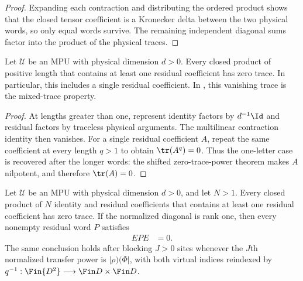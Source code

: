 \begin{proof}\leanok
    Expanding each contraction and distributing the ordered product shows that the closed
    tensor coefficient is a Kronecker delta between the two physical words,
    so only equal words survive.  The remaining independent diagonal sums
    factor into the product of the physical traces.
\end{proof}

\begin{lemma}
    \label{thm:mpu_positive_mixed_residual_trace}
    \leanok
    Let $\mathcal U$ be an MPU with physical dimension $d>0$.  Every closed
    product of positive length that contains at least one residual coefficient
    has zero trace.  In particular, this includes a single residual
    coefficient.  In \cite[Proposition~III.3(ii)]{Cirac2017MPU}, this vanishing trace is the mixed-trace
    property.
\end{lemma}

\begin{proof}\leanok
    At lengths greater than one, represent identity factors by
    $d^{-1}\Id$ and residual factors by traceless physical arguments.  The
    multilinear contraction identity then vanishes.  For a single residual
    coefficient $A$, repeat the same coefficient at every length $q>1$ to
    obtain $\tr(A^q)=0$.  Thus the one-letter case is recovered after the
    longer words: the shifted zero-trace-power theorem makes $A$ nilpotent,
    and therefore $\tr(A)=0$.
\end{proof}

\begin{lemma}
    \label{thm:mpu_controlled_mixed_residual_trace}
    \leanok
    Let $\mathcal U$ be an MPU with physical dimension $d>0$, and let
    $N>1$.  Every closed product of $N$ identity and residual
    coefficients that contains at least one residual coefficient has zero
    trace.  If the normalized diagonal is rank one, then every nonempty
    residual word $P$ satisfies
    \begin{align}
        EPE & =0.
    \end{align}
    The same conclusion holds after blocking $J>0$ sites whenever the
    $J$th normalized transfer power is $|\rho)(\Phi|$, with both virtual
    indices reindexed by $q^{-1}:\Fin{D^2}\longrightarrow\Fin D\times\Fin D$.
\end{lemma}

